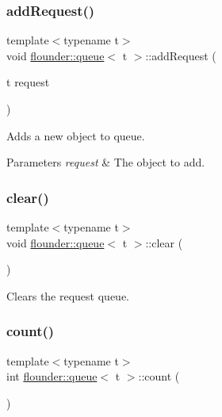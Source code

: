 \subsubsection{\texorpdfstring{add\+Request()}{addRequest()}}
{\footnotesize\ttfamily template$<$typename t$>$ \\
void \hyperlink{classflounder_1_1queue}{flounder\+::queue}$<$ t $>$\+::add\+Request (\begin{DoxyParamCaption}\item[{t}]{request }\end{DoxyParamCaption})\hspace{0.3cm}{\ttfamily [inline]}}



Adds a new object to queue. 


\begin{DoxyParams}{Parameters}
{\em request} & The object to add. \\
\hline
\end{DoxyParams}
\mbox{\label{classflounder_1_1queue_a6d104250ee0f4cab52dafc908fb926f2}} 
\subsubsection{\texorpdfstring{clear()}{clear()}}
{\footnotesize\ttfamily template$<$typename t$>$ \\
void \hyperlink{classflounder_1_1queue}{flounder\+::queue}$<$ t $>$\+::clear (\begin{DoxyParamCaption}{ }\end{DoxyParamCaption})\hspace{0.3cm}{\ttfamily [inline]}}



Clears the request queue. 

\mbox{\label{classflounder_1_1queue_aa424879808961c595a64397dc9097f4e}} 
\subsubsection{\texorpdfstring{count()}{count()}}
{\footnotesize\ttfamily template$<$typename t$>$ \\
int \hyperlink{classflounder_1_1queue}{flounder\+::queue}$<$ t $>$\+::count (\begin{DoxyParamCaption}{ }\end{DoxyParamCaption})\hspace{0.3cm}{\ttfamily [inline]}}



